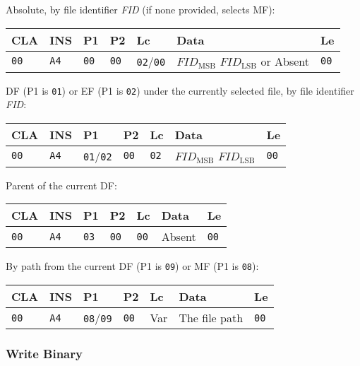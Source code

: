 \documentclass{article}
\begin{document}
Absolute, by file identifier \textit{FID} (if none provided, selects
MF):
\begin{flushleft}
\begin{tabular}{|l|l|l|l|l|l|l|}
\hline
CLA & INS & P1 & P2 & Lc & Data & Le \\
\hline
\texttt{00} & \texttt{A4} & \texttt{00} & \texttt{00} & \texttt{02}/\texttt{00} &
$\mathit{FID}_{\mathrm{MSB}}$ $\mathit{FID}_{\mathrm{LSB}}$ or Absent & \texttt{00} \\
\hline
\end{tabular}
\end{flushleft}
DF (P1 is \texttt{01}) or EF (P1 is \texttt{02}) under the currently selected file, by file identifier \textit{FID}:
\begin{flushleft}
\begin{tabular}{|l|l|l|l|l|l|l|}
\hline
CLA & INS & P1 & P2 & Lc & Data & Le \\
\hline
\texttt{00} & \texttt{A4} & \texttt{01}/\texttt{02} & \texttt{00} & \texttt{02} &
$\mathit{FID}_{\mathrm{MSB}}$ $\mathit{FID}_{\mathrm{LSB}}$ & \texttt{00} \\
\hline
\end{tabular}
\end{flushleft}
Parent of the current DF:
\begin{flushleft}
\begin{tabular}{|l|l|l|l|l|l|l|}
\hline
CLA & INS & P1 & P2 & Lc & Data & Le \\
\hline
\texttt{00} & \texttt{A4} & \texttt{03} & \texttt{00} & \texttt{00} &
Absent & \texttt{00} \\
\hline
\end{tabular}
\end{flushleft}
By path from the current DF (P1 is \texttt{09}) or MF (P1 is
\texttt{08}):
\begin{flushleft}
\begin{tabular}{|l|l|l|l|l|l|l|}
\hline
CLA & INS & P1 & P2 & Lc & Data & Le \\
\hline
\texttt{00} & \texttt{A4} & \texttt{08}/\texttt{09} & \texttt{00} & Var &
The file path & \texttt{00} \\
\hline
\end{tabular}
\end{flushleft}

\subsubsection{Write Binary}
\end{document}
